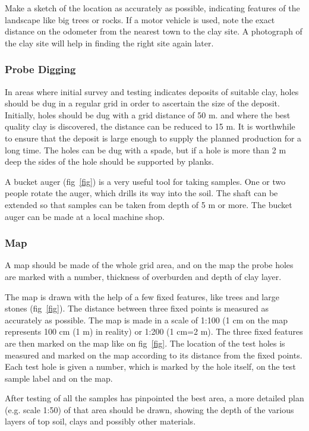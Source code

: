 Make a sketch of the location as accurately as possible, indicating features of 
the landscape like big trees or rocks. If a motor vehicle is used, note the 
exact distance on the odometer from the nearest town to the clay site. A 
photograph of the clay site will help in finding the right site again later.
\subsubsection{Probe Digging}
In areas where initial survey and testing indicates deposits of suitable clay, 
holes should be dug in a regular grid in order to ascertain the size of the 
deposit. Initially, holes should be dug with a grid distance of 50 m. and where 
the best quality clay is discovered, the distance can be reduced to 15 m. It is 
worthwhile to ensure that the deposit is large enough to supply the planned 
production for a long time. The holes can be dug with a spade, but if a hole is 
more than 2 m deep the sides of the hole should be supported by planks.

A bucket auger (fig~\ref{fig}) is a very useful tool for taking samples. One or 
two people rotate the auger, which drills its way into the soil. The shaft can 
be extended so that samples can be taken from depth of 5 m or more. The bucket 
auger can be made at a local machine shop.
\subsubsection{Map}
A map should be made of the whole grid area, and on the map the probe holes are 
marked with a number, thickness of overburden and depth of clay layer.

The map is drawn with the help of a few fixed features, like trees and large 
stones (fig~\ref{fig}). The distance between three fixed points is measured as 
accurately as possible. The map is made in a scale of 1:100 (1 cm on the map 
represents 100 cm (1 m) in reality) or 1:200 (1 cm=2 m). The three fixed features 
are then marked on the map like on fig~\ref{fig}. The location of the test 
holes is measured and marked on the map according to its distance from the 
fixed points. Each test hole is given a number, which is marked by the hole 
itself, on the test sample label and on the map.

After testing of all the samples has pinpointed the best area, a more detailed 
plan (e.g. scale 1:50) of that area should be drawn, showing the depth of the 
various layers of top soil, clays and possibly other materials.
